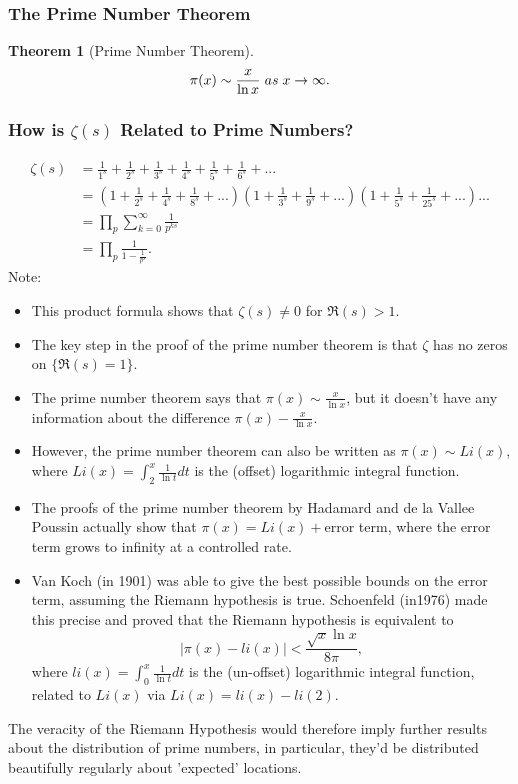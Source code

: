 \documentclass{article}
\newtheorem{theorem}{Theorem}[section]
\begin{document}
\subsubsection{The Prime Number Theorem}
\begin{theorem}[Prime Number Theorem]
\begin{equation*}
\pi(x) \sim \frac{x}{\ln x} \hspace{0.1cm} as \hspace{0.1cm} x \to \infty.
\end{equation*}
\end{theorem}

\subsubsection{How is $\zeta(s)$ Related to Prime Numbers?}
\begin{align*}
\zeta(s) &= \frac{1}{1^s} + \frac{1}{2^s} + \frac{1}{3^s} + \frac{1}{4^s} + \frac{1}{5^s} + \frac{1}{6^s} + ... \\
&= (1 + \frac{1}{2^s} + \frac{1}{4^s} + \frac{1}{8^s} + ...)(1 + \frac{1}{3^s} + \frac{1}{9^s} + ...)(1 + \frac{1}{5^s} + \frac{1}{25^s} + ...)... \\
&= \prod_{p} \sum_{k=0}^{\infty} \frac{1}{p^{ks}} \\
&= \prod_{p} \frac{1}{1 - \frac{1}{p^s}}.
\end{align*}
Note:
\begin{itemize}
\item This product formula shows that $\zeta(s) \neq 0$ for $\Re(s) > 1$.
\item The key step in the proof of the prime number theorem is that $\zeta$ has no zeros on $\{ \Re(s) = 1\}$.
\item The prime number theorem says that $\pi(x) \sim \frac{x}{\ln x}$, but it doesn't have any information about the difference $\pi(x) - \frac{x}{\ln x}$.
\item However, the prime number theorem can also be written as $\pi(x) \sim Li(x)$, where $Li(x) = \int_2^x \frac{1}{\ln t}dt$ is the (offset) logarithmic integral function.
\item The proofs of the prime number theorem by Hadamard and de la Vallee Poussin actually show that $\pi(x) = Li(x) + $error term, where the error term grows to infinity at a controlled rate.
\item Van Koch (in 1901) was able to give the best possible bounds on the error term, assuming the Riemann hypothesis is true. Schoenfeld (in1976) made this precise and proved that the Riemann hypothesis is equivalent to 
\begin{equation*}
\left| \pi(x) - li(x)\right| < \frac{\sqrt{x} \ln x}{8\pi},
\end{equation*}
where $li(x) = \int_0^x \frac{1}{\ln t}dt$ is the (un-offset) logarithmic integral function, related to $Li(x)$ via $Li(x) = li(x) - li(2)$.
\end{itemize}
The veracity of the Riemann Hypothesis would therefore imply further results about the distribution of prime numbers, in particular, they'd be distributed beautifully regularly about 'expected' locations.
\end{document}
